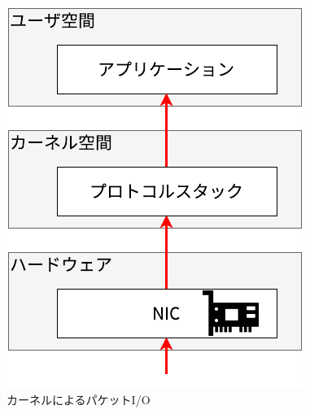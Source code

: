 \begin{figure}[htb]
  \centering
  \includegraphics[width=0.5\columnwidth]{pictures/KernelPacketIO.pdf}
  \caption{カーネルによるパケットI/O}
  \label{fig:KernelPacketIO}
\end{figure}
